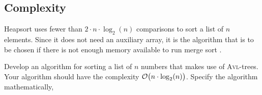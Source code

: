 \subsection{Complexity}
Heapsort uses fewer than $2 \cdot n \cdot \log_2(n)$ comparisons to sort a list of $n$ elements.  Since it does
not need an auxiliary array, it is the algorithm that is to be chosen if there is not enough memory available
to run merge sort \cite{sedgewick:2011}.  

\exercise
Develop an algorithm for sorting a list of $n$ numbers that makes use of \textsc{Avl}-trees.  Your algorithm
should have the complexity $\mathcal{O}\bigl(n \cdot \log_2(n)\bigr)$.  Specify the algorithm mathematically,
\eox


